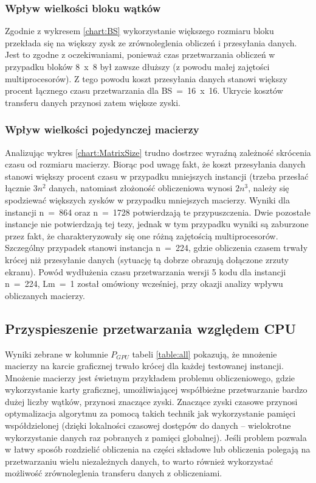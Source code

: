 \documentclass[12pt,a4paper]{article}
\begin{document}
\subsubsection*{Wpływ wielkości bloku wątków}

Zgodnie z wykresem \ref{chart:BS} wykorzystanie większego rozmiaru bloku przekłada się na większy zysk ze zrównoleglenia obliczeń i przesyłania danych. Jest to zgodne z oczekiwaniami, ponieważ czas przetwarzania obliczeń w przypadku bloków 8~x~8 był zawsze dłuższy (z powodu małej zajętości multiprocesorów). Z tego powodu koszt przesyłania danych stanowi większy procent łącznego czasu przetwarzania dla BS~=~16~x~16. Ukrycie kosztów transferu danych przynosi zatem większe zyski.

\subsubsection*{Wpływ wielkości pojedynczej macierzy}

Analizując wykres \ref{chart:MatrixSize} trudno dostrzec wyraźną zależność skrócenia czasu od rozmiaru macierzy. Biorąc pod uwagę fakt, że koszt przesyłania danych stanowi większy procent czasu w przypadku mniejszych instancji (trzeba przesłać łącznie $3n^2$ danych, natomiast złożoność obliczeniowa wynosi $2n^3$, należy się spodziewać większych zysków w przypadku mniejszych macierzy. Wyniki dla instancji n~=~864 oraz n~=~1728 potwierdzają te przypuszczenia. Dwie pozostałe instancje nie potwierdzają tej tezy, jednak w tym przypadku wyniki są zaburzone przez fakt, że charakteryzowały się one różną zajętością multiprocesorów. Szczególny przypadek stanowi instancja n~=~224, gdzie obliczenia czasem trwały krócej niż przesyłanie danych (sytuację tą dobrze obrazują dołączone zrzuty ekranu). Powód wydłużenia czasu przetwarzania wersji 5 kodu dla instancji n~=~224, Lm~=~1 został omówiony wcześniej, przy okazji analizy wpływu obliczanych macierzy.


\subsection{Przyspieszenie przetwarzania względem CPU}

Wyniki zebrane w kolumnie $P_{GPU}$ tabeli \ref{table:all} pokazują, że mnożenie macierzy na karcie graficznej trwało krócej dla każdej testowanej instancji. Mnożenie macierzy jest świetnym przykładem problemu obliczeniowego, gdzie wykorzystanie karty graficznej, umożliwiającej współbieżne przetwarzanie bardzo dużej liczby wątków, przynosi znaczące zyski. Znaczące zyski czasowe przynosi optymalizacja algorytmu za pomocą takich technik jak wykorzystanie pamięci współdzielonej (dzięki lokalności czasowej dostępów do danych -- wielokrotne wykorzystanie danych raz pobranych z pamięci globalnej). Jeśli problem pozwala w łatwy sposób rozdzielić obliczenia na części składowe lub obliczenia polegają na przetwarzaniu wielu niezależnych danych, to warto również wykorzystać możliwość zrównoleglenia transferu danych z obliczeniami.
\end{document}
